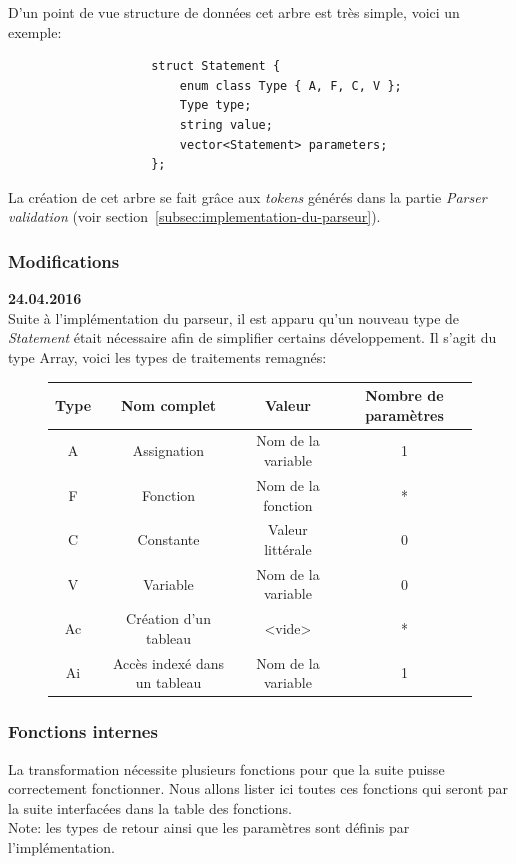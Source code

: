 \documentclass[french]{article}
\begin{document}
		D'un point de vue structure de données cet arbre est très simple, voici un exemple:
		
		\begin{lstlisting}
					struct Statement {
						enum class Type { A, F, C, V };
						Type type;
						string value;
						vector<Statement> parameters;
					};
		\end{lstlisting}
		
		La création de cet arbre se fait grâce aux \textit{tokens} générés dans la partie \textit{Parser validation} (voir section~\ref{subsec:implementation-du-parseur}).
		
		\subsubsection{Modifications}
		\textbf{24.04.2016}\\
		Suite à l'implémentation du parseur, il est apparu qu'un nouveau type de \textit{Statement} était nécessaire afin de simplifier certains développement. Il s'agit du type Array, voici les types de traitements remagnés:
		
		\begin{figure}[H]
			\centering
			\begin{tabular}{cccc}
				Type & Nom complet & Valeur & Nombre de paramètres\\
				\hline
				A & Assignation & Nom de la variable & 1\\
				F & Fonction & Nom de la fonction & *\\
				C & Constante & Valeur littérale & 0\\
				V & Variable & Nom de la variable & 0\\
				Ac & Création d'un tableau & <vide> & *\\
				Ai & Accès indexé dans un tableau & Nom de la variable & 1\\
			\end{tabular}
		\end{figure}
		
		\subsubsection{Fonctions internes}
		La transformation nécessite plusieurs fonctions pour que la suite puisse correctement fonctionner. Nous allons lister ici toutes ces fonctions qui seront par la suite interfacées dans la table des fonctions.\\
		
		Note: les types de retour ainsi que les paramètres sont définis par l'implémentation.
		
\end{document}
